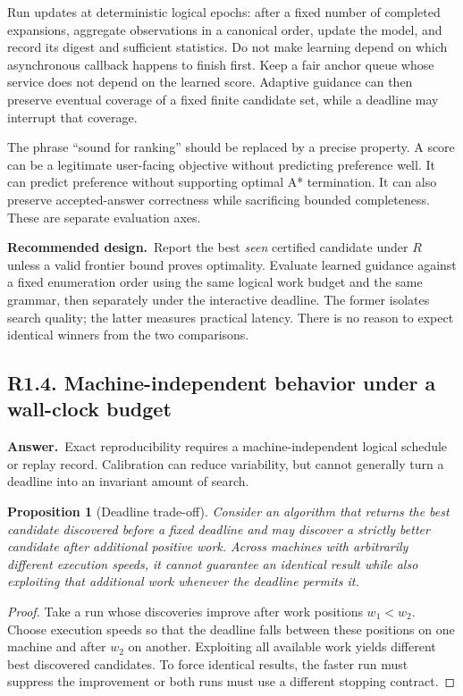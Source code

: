 \documentclass[11pt,a4paper]{article}
\newcommand{\qid}[3]{\subsection{#2. #3}\label{#1}}
\newcommand{\answer}{\noindent\textbf{Answer.}\ }
\newcommand{\proposal}{\noindent\textbf{Recommended design.}\ }
\newtheorem{proposition}{Proposition}[section]
\theoremstyle{remark}
\begin{document}
Run updates at deterministic logical epochs: after a fixed number of completed expansions, aggregate observations in a canonical order, update the model, and record its digest and sufficient statistics. Do not make learning depend on which asynchronous callback happens to finish first. Keep a fair anchor queue whose service does not depend on the learned score. Adaptive guidance can then preserve eventual coverage of a fixed finite candidate set, while a deadline may interrupt that coverage.

The phrase ``sound for ranking'' should be replaced by a precise property. A score can be a legitimate user-facing objective without predicting preference well. It can predict preference without supporting optimal A* termination. It can also preserve accepted-answer correctness while sacrificing bounded completeness. These are separate evaluation axes.

\proposal Report the best \emph{seen} certified candidate under $R$ unless a valid frontier bound proves optimality. Evaluate learned guidance against a fixed enumeration order using the same logical work budget and the same grammar, then separately under the interactive deadline. The former isolates search quality; the latter measures practical latency. There is no reason to expect identical winners from the two comparisons.

\qid{q14}{R1.4}{Machine-independent behavior under a wall-clock budget}
\answer Exact reproducibility requires a machine-independent logical schedule or replay record. Calibration can reduce variability, but cannot generally turn a deadline into an invariant amount of search.

\begin{proposition}[Deadline trade-off]
Consider an algorithm that returns the best candidate discovered before a fixed deadline and may discover a strictly better candidate after additional positive work. Across machines with arbitrarily different execution speeds, it cannot guarantee an identical result while also exploiting that additional work whenever the deadline permits it.
\end{proposition}
\begin{proof}
Take a run whose discoveries improve after work positions $w_1<w_2$. Choose execution speeds so that the deadline falls between these positions on one machine and after $w_2$ on another. Exploiting all available work yields different best discovered candidates. To force identical results, the faster run must suppress the improvement or both runs must use a different stopping contract.
\end{proof}
\end{document}
